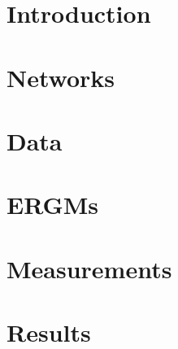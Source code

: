 \documentclass[]{article}
\begin{document}
    

    

    \section{Introduction}

    

    \section{Networks}

    

    \section{Data}

    

    \section{ERGMs}

    

    \section{Measurements}

    
    
    \section{Results}

    

    
    
\end{document}

